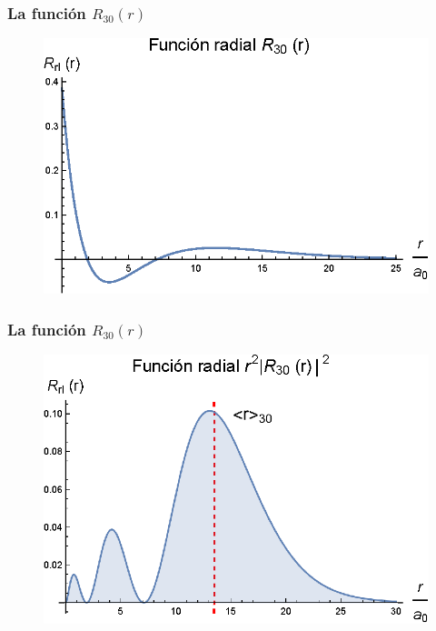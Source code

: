 \documentclass[12pt]{beamer}
\begin{document}
\begin{frame}
\frametitle{La función $R_{30} (r)$}
\begin{figure}
   \centering
   \includegraphics[scale=1]{Imagenes/Plot_Funcion_Radial_Hidrogeno_30_01.eps}
\end{figure}
\end{frame}
\begin{frame}
\frametitle{La función $R_{30} (r)$}
\begin{figure}
   \centering
   \includegraphics[scale=1]{Imagenes/Plot_Funcion_Radial_Hidrogeno_30_02.eps}
\end{figure}
\end{frame}
\end{document}
